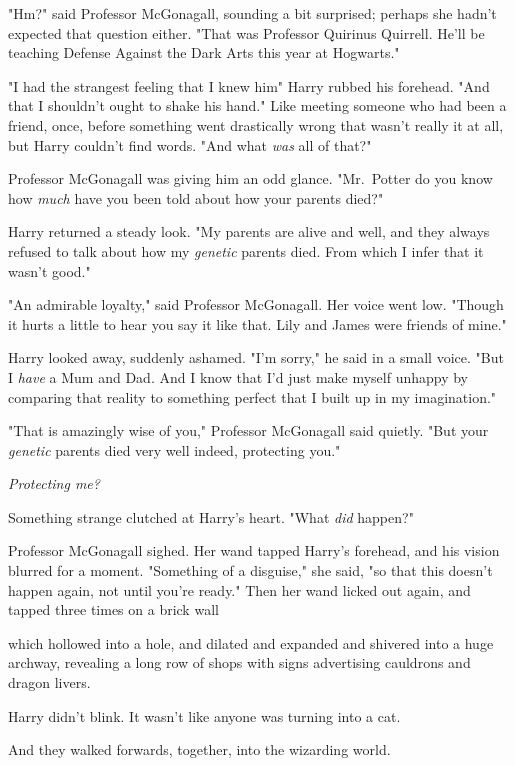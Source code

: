 "Hm?" said Professor McGonagall, sounding a bit surprised; perhaps she hadn't
expected that question either. "That was Professor Quirinus Quirrell. He'll be
teaching Defense Against the Dark Arts this year at Hogwarts."

"I had the strangest feeling that I knew him{\el}" Harry rubbed his
forehead. "And that I shouldn't ought to shake his hand." Like meeting someone
who had been a friend, once, before something went drastically wrong{\el}
that wasn't really it at all, but Harry couldn't find words. "And what
\emph{was{\el}} all of that?"

Professor McGonagall was giving him an odd glance. "Mr.~Potter{\el} do you
know{\el} how \emph{much} have you been told{\el} about how your parents
died?"

Harry returned a steady look. "My parents are alive and well, and they always
refused to talk about how my \emph{genetic} parents died. From which I infer
that it wasn't good."

"An admirable loyalty," said Professor McGonagall. Her voice went low. "Though
it hurts a little to hear you say it like that. Lily and James were friends of
mine."

Harry looked away, suddenly ashamed. "I'm sorry," he said in a small voice.
"But I \emph{have} a Mum and Dad. And I know that I'd just make myself unhappy
by comparing that reality to{\el} something perfect that I built up in my
imagination."

"That is amazingly wise of you," Professor McGonagall said quietly. "But your
\emph{genetic} parents died very well indeed, protecting you."

\emph{Protecting me?}

Something strange clutched at Harry's heart. "What{\el} \emph{did} happen?"

Professor McGonagall sighed. Her wand tapped Harry's forehead, and his vision
blurred for a moment. "Something of a disguise," she said, "so that this
doesn't happen again, not until you're ready." Then her wand licked out again,
and tapped three times on a brick wall{\el}

{\el}which hollowed into a hole, and dilated and expanded and shivered into
a huge archway, revealing a long row of shops with signs advertising cauldrons
and dragon livers.

Harry didn't blink. It wasn't like anyone was turning into a cat.

And they walked forwards, together, into the wizarding world.

